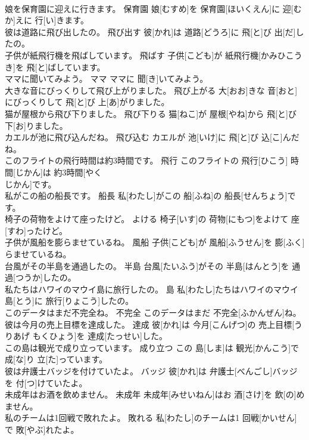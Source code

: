 \documentclass[8pt]{extreport}
\begin{document}
\begin{CJK}{UTF8}{min}
\\	娘を保育園に迎えに行きます。	保育園	娘[むすめ]を 保育園[ほいくえん]に 迎[むか]えに 行[い]きます。	
\\	彼は道路に飛び出したの。	飛び出す	彼[かれ]は 道路[どうろ]に 飛[と]び 出[だ]したの。	
\\	子供が紙飛行機を飛ばしています。	飛ばす	子供[こども]が 紙飛行機[かみひこうき]を 飛[と]ばしています。	
\\	ママに聞いてみよう。	ママ	ママに 聞[き]いてみよう。	
\\	大きな音にびっくりして飛び上がりました。	飛び上がる	大[おお]きな 音[おと]にびっくりして 飛[と]び 上[あ]がりました。	
\\	猫が屋根から飛び下りました。	飛び下りる	猫[ねこ]が 屋根[やね]から 飛[と]び 下[お]りました。	
\\	カエルが池に飛び込んだね。	飛び込む	カエルが 池[いけ]に 飛[と]び 込[こ]んだね。	
\\	このフライトの飛行時間は約3時間です。	飛行	このフライトの 飛行[ひこう] 時間[じかん]は 約3時間[やく 
\\	じかん]です。	
\\	私がこの船の船長です。	船長	私[わたし]がこの 船[ふね]の 船長[せんちょう]です。	
\\	椅子の荷物をよけて座ったけど。	よける	椅子[いす]の 荷物[にもつ]をよけて 座[すわ]ったけど。	
\\	子供が風船を膨らませているね。	風船	子供[こども]が 風船[ふうせん]を 膨[ふく]らませているね。	
\\	台風がその半島を通過したの。	半島	台風[たいふう]がその 半島[はんとう]を 通過[つうか]したの。	
\\	私たちはハワイのマウイ島に旅行したの。	島	私[わたし]たちはハワイのマウイ 島[とう]に 旅行[りょこう]したの。	
\\	このデータはまだ不完全ね。	不完全	このデータはまだ 不完全[ふかんぜん]ね。	
\\	彼は今月の売上目標を達成した。	達成	彼[かれ]は 今月[こんげつ]の 売上目標[うりあげ もくひょう]を 達成[たっせい]した。	
\\	この島は観光で成り立っています。	成り立つ	この 島[しま]は 観光[かんこう]で 成[な]り 立[た]っています。	
\\	彼は弁護士バッジを付けていたよ。	バッジ	彼[かれ]は 弁護士[べんごし]バッジを 付[つ]けていたよ。	
\\	未成年はお酒を飲めません。	未成年	未成年[みせいねん]はお 酒[さけ]を 飲[の]めません。	
\\	私のチームは1回戦で敗れたよ。	敗れる	私[わたし]のチームは1 回戦[かいせん]で 敗[やぶ]れたよ。	

\end{CJK}
\end{document}
